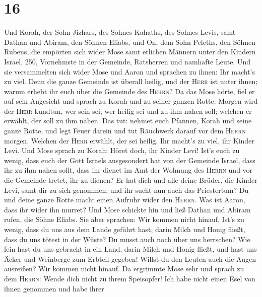 \hypertarget{section-15}{%
\section{16}\label{section-15}}

 Und Korah, der Sohn Jizhars, des Sohnes Kahaths, des
Sohnes Levis, samt Dathan und Abiram, den Söhnen Eliabs, und On, dem
Sohn Peleths, den Söhnen Rubens,  die empörten sich wider
Mose samt etlichen Männern unter den Kindern Israel, 250, Vornehmste in
der Gemeinde, Ratsherren und namhafte Leute.  Und sie
versammelten sich wider Mose und Aaron und sprachen zu ihnen: Ihr
macht's zu viel. Denn die ganze Gemeinde ist überall heilig, und der
\textsc{Herr} ist unter ihnen; warum erhebt ihr euch über die Gemeinde
des \textsc{Herrn}?  Da das Mose hörte, fiel er auf sein
Angesicht  und sprach zu Korah und zu seiner ganzen Rotte:
Morgen wird der \textsc{Herr} kundtun, wer sein sei, wer heilig sei und
zu ihm nahen soll; welchen er erwählt, der soll zu ihm nahen.
 Das tut: nehmet euch Pfannen, Korah und seine ganze
Rotte,  und legt Feuer darein und tut Räuchwerk darauf vor
dem \textsc{Herrn} morgen. Welchen der \textsc{Herr} erwählt, der sei
heilig. Ihr macht's zu viel, ihr Kinder Levi.  Und Mose
sprach zu Korah: Höret doch, ihr Kinder Levi!  Ist's euch
zu wenig, dass euch der Gott Israels ausgesondert hat von der Gemeinde
Israel, dass ihr zu ihm nahen sollt, dass ihr dienet im Amt der Wohnung
des \textsc{Herrn} und vor die Gemeinde tretet, ihr zu dienen?
 Er hat dich und alle deine Brüder, die Kinder Levi, samt
dir zu sich genommen; und ihr sucht nun auch das Priestertum?
 Du und deine ganze Rotte macht einen Aufruhr wider den
\textsc{Herrn}. Was ist Aaron, dass ihr wider ihn murret?
 Und Mose schickte hin und ließ Dathan und Abiram rufen,
die Söhne Eliabs. Sie aber sprachen: Wir kommen nicht hinauf.
 Ist's zu wenig, dass du uns aus dem Lande geführt hast,
darin Milch und Honig fließt, dass du uns tötest in der Wüste? Du musst
auch noch über uns herrschen?  Wie fein hast du uns
gebracht in ein Land, darin Milch und Honig fließt, und hast uns Äcker
und Weinberge zum Erbteil gegeben! Willst du den Leuten auch die Augen
ausreißen? Wir kommen nicht hinauf.  Da ergrimmte Mose
sehr und sprach zu dem \textsc{Herrn}: Wende dich nicht zu ihrem
Speisopfer! Ich habe nicht einen Esel von ihnen genommen und habe ihrer
